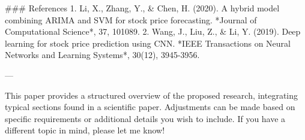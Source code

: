 ### References
1. Li, X., Zhang, Y., & Chen, H. (2020). A hybrid model combining ARIMA and SVM for stock price forecasting. *Journal of Computational Science*, 37, 101089.
2. Wang, J., Liu, Z., & Li, Y. (2019). Deep learning for stock price prediction using CNN. *IEEE Transactions on Neural Networks and Learning Systems*, 30(12), 3945-3956.

---

This paper provides a structured overview of the proposed research, integrating typical sections found in a scientific paper. Adjustments can be made based on specific requirements or additional details you wish to include. If you have a different topic in mind, please let me know!